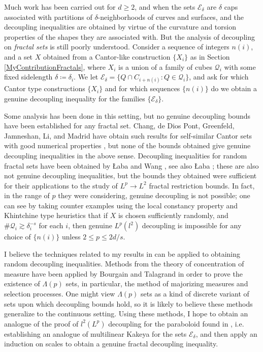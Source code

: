 \documentclass[11pt]{article}
\begin{document}
Much work has been carried out for $d \geq 2$, and when the sets $\mathcal{E}_\delta$ are $\delta$ caps associated with partitions of $\delta$-neighborhoods of curves and surfaces, and the decoupling inequalities are obtained by virtue of the curvature and torsion properties of the shapes they are associated with. But the analysis of decoupling on \emph{fractal sets} is still poorly understood. %
Consider a sequence of integers $n(i)$, and a set $X$ obtained from a Cantor-like construction $\{ X_i \}$ as in Section \ref{MyContributionFractals}, where $X_i$ is a union of a family of cubes $\mathcal{Q}_i$ with some fixed sidelength $\delta \coloneqq \delta_i$. We let $\mathcal{E}_\delta = \{ Q \cap C_{i + n(i)} : Q \in \mathcal{Q}_i \}$, and ask for which Cantor type constructions $\{ X_i \}$ and for which sequences $\{ n(i) \}$ do we obtain a genuine decoupling inequality for the families $\{ \mathcal{E}_\delta \}$.

Some analysis has been done in this setting, but no genuine decoupling bounds have been established for any fractal set. Chang, de Dios Pont, Greenfeld, Jamneshan, Li, and Madrid have obtain such results for self-similar Cantor sets with good numerical properties \cite{ChangJaumeGreenfeldJamneshanLiMadrid}, but none of the bounds obtained give genuine decoupling inequalities in the above sense. Decoupling inequalities for random fractal sets have been obtained by {\L}aba and Wang \cite{LabaWang}, see also {\L}aba \cite{Laba2}; these are also not genuine decoupling inequalities, but the bounds they obtained were sufficient for their applications to the study of $L^p \to L^2$ fractal restriction bounds. In fact, in the range of $p$ they were considering, genuine decoupling is not possible; one can see by taking counter examples using the local constancy property and Khintchine type heuristics that if $X$ is chosen sufficiently randomly, and $\# \mathcal{Q}_i \gtrsim \delta_i^{-s}$ for each $i$, then genuine $L^p(l^2)$ decoupling is impossible for any choice of $\{ n(i) \}$ unless $2 \leq p \leq 2d/s$.

I believe the techniques related to my results in \cite{DensonFourier} can be applied to obtaining random decoupling inequalities. Methods from the theory of concentration of measure have been applied by Bourgain \cite{Bourgain} and Talagrand \cite{Talagrand} in order to prove the existence of $\Lambda(p)$ sets, in particular, the method of majorizing measures and selection processes. One might view $\Lambda(p)$ sets as a kind of discrete variant of sets upon which decoupling bounds hold, so it is likely to believe these methods generalize to the continuous setting. Using these methods, I hope to obtain an analogue of the proof of $l^2(L^p)$ decoupling for the paraboloid found in \cite{BourgainDemeterStudyGuide}, i.e. establishing an analogue of multilinear Kakeya for the sets $\mathcal{E}_\delta$, and then apply an induction on scales to obtain a genuine fractal decoupling inequality.
\end{document}
